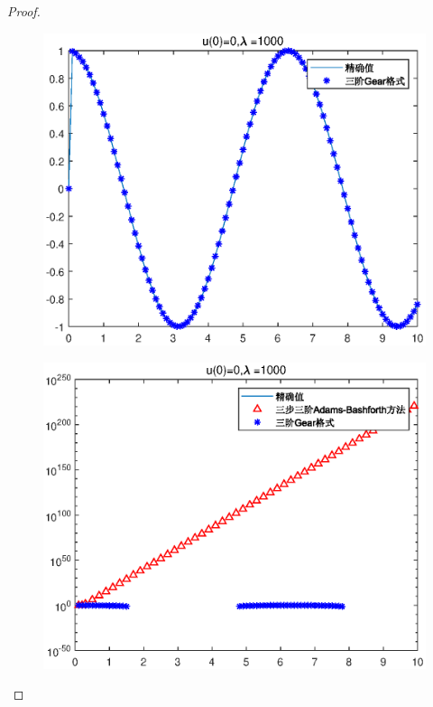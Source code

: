 \documentclass{article}%
\begin{document}
\begin{proof}
\begin{figure}
	\includegraphics[width=1\linewidth]{pic/week7_1_9.eps}
	\label{Fig:9}
	\caption{} 
\end{figure}
\begin{figure}
	\includegraphics[width=1\linewidth]{pic/week7_1_10.eps}
	\label{Fig:10}
	\caption{} 
\end{figure}
\begin{figure}

\end{figure}
\end{proof}
\end{document}
